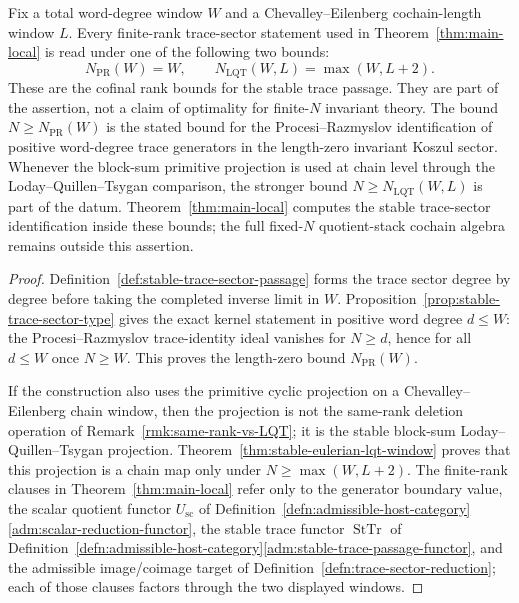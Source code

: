 \documentclass[11pt]{memoir}
\begin{document}
\begin{lem}\label{lem:stable-window-contract}
  Fix a total word-degree window \(W\) and a Chevalley--Eilenberg
  cochain-length window \(L\).  Every finite-rank trace-sector statement
  used in Theorem~\ref{thm:main-local} is read under one of the following
  two bounds:
  \[
    N_{\mathrm{PR}}(W)=W,\qquad
    N_{\mathrm{LQT}}(W,L)=\max(W,L+2).
  \]
  These are the cofinal rank bounds for the stable trace passage.  They
  are part of the assertion, not a claim of optimality for
  finite-\(N\) invariant theory.  The bound
  \(N\geq N_{\mathrm{PR}}(W)\) is the stated bound for the
  Procesi--Razmyslov identification of positive word-degree trace
  generators in the length-zero invariant Koszul sector.  Whenever the
  block-sum primitive projection is used at chain level through the
  Loday--Quillen--Tsygan comparison, the stronger bound
  \(N\geq N_{\mathrm{LQT}}(W,L)\) is part of the datum.
  Theorem~\ref{thm:main-local} computes the stable trace-sector
  identification inside these bounds; the full fixed-\(N\)
  quotient-stack cochain algebra remains outside this assertion.
\end{lem}

\begin{proof}
  Definition~\ref{def:stable-trace-sector-passage} forms the trace
  sector degree by degree before taking the completed inverse limit in
  \(W\).  Proposition~\ref{prop:stable-trace-sector-type} gives the
  exact kernel statement in positive word degree \(d\leq W\):
  the Procesi--Razmyslov trace-identity ideal vanishes for
  \(N\geq d\), hence for all \(d\leq W\) once \(N\geq W\).
  This proves the length-zero bound \(N_{\mathrm{PR}}(W)\).

  If the construction also uses the primitive cyclic projection on a
  Chevalley--Eilenberg chain window, then the projection is not the
  same-rank deletion operation of Remark~\ref{rmk:same-rank-vs-LQT};
  it is the stable block-sum Loday--Quillen--Tsygan projection.
  Theorem~\ref{thm:stable-eulerian-lqt-window} proves that this
  projection is a chain map only under
  \(N\geq\max(W,L+2)\).  The finite-rank clauses in
  Theorem~\ref{thm:main-local} refer only to the generator boundary
  value, the scalar quotient functor
  \(U_{\mathrm{sc}}\) of
  Definition~\ref{defn:admissible-host-category}\ref{adm:scalar-reduction-functor},
  the stable trace functor \(\operatorname{StTr}\) of
  Definition~\ref{defn:admissible-host-category}\ref{adm:stable-trace-passage-functor},
  and the admissible image/coimage target of
  Definition~\ref{defn:trace-sector-reduction};
  each of those clauses factors through the two displayed windows.
\end{proof}
\end{document}
